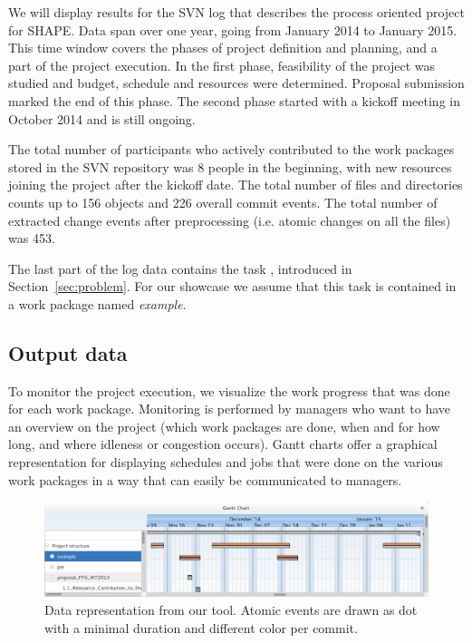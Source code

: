 We will display results for the SVN log that describes the process oriented project for SHAPE. Data span over one year, going from January 2014 to January 2015. This time window covers the phases of project definition and planning, and a part of the project execution. In the first phase, feasibility of the project was studied and budget, schedule and resources were determined. Proposal submission marked the end of this phase. The second phase started with a kickoff meeting in October 2014 and is still ongoing.

The total number of participants who actively contributed to the work packages stored in the SVN repository was 8 people in the beginning, with new resources joining the project after the kickoff date. The total number of files and directories counts up to 156 objects and 226 overall commit events. The total number of extracted change events after preprocessing (i.e. atomic changes on all the files) was 453.

The last part of the log data contains the task , introduced in Section~\ref{sec:problem}. For our showcase we assume that this task is contained in a work package named \emph{example}.

\subsection{Output data}

To monitor the project execution, we visualize the work progress that was done for each work package. Monitoring is performed by managers who want to have an overview on the project (which work packages are done, when and for how long, and where idleness or congestion occurs). Gantt charts offer a graphical representation for displaying schedules and jobs that were done on the various work packages \citep{wilson2003gantt} in a way that can easily be communicated to managers.

\begin{figure}
\centering
\includegraphics[width=\textwidth]{bpm2015/imgs/aggregation_and_not}
\caption{Data representation from our tool. Atomic events are drawn as dot with a minimal duration and different color per commit. }
\label{fig:example-screenshot}
\end{figure}

